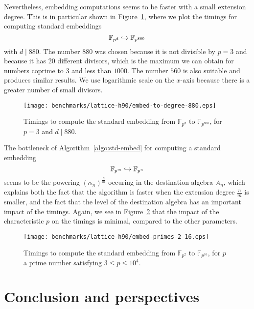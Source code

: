 Nevertheless, embedding computations seems to be faster with a small extension
degree. This is in particular shown in Figure~\ref{fig:embed-to-880}, where we
plot the timings for computing standard embeddings
\[
  \mathbb{F}_{p^d}\hookrightarrow\mathbb{F}_{p^{880}}
\]
with $d\mid880$. The number $880$ was chosen because it is not divisible by
$p=3$ and because it has 20 different divisors, which is the maximum we can
obtain for numbers coprime to $3$ and less than $1000$. The number $560$ is
also suitable and produces similar results. We use logarithmic scale on the
$x$-axis because there is a greater number of small divisors.
\begin{figure}
  \centering
  \texttt{[image: benchmarks/lattice-h90/embed-to-degree-880.eps]}
  \caption{Timings to compute the standard embedding from $\mathbb{F}_{p^d}$ to
  $\mathbb{F}_{p^{880}}$, for $p=3$ and $d\mid880$.}
  \label{fig:embed-to-880}
\end{figure}
The bottleneck of Algorithm~\ref{algo:std-embed} for computing a standard
embedding
\[
  \mathbb{F}_{p^m}\hookrightarrow\mathbb{F}_{p^{n}}
\]
seems to be the powering $(\alpha_n)^{\frac{n}{m}}$ occuring in the destination algebra
$A_n$, which explains both the fact
that the algorithm is faster when the extension degree $\frac{n}{m}$ is smaller,
and the fact that the level of the destination algebra has an important impact
of the timings.
Again, we see in Figure~\ref{fig:embed-primes} that the impact of the
characteristic $p$ on the timings is minimal, compared to the other parameters.
\begin{figure}
  \centering
  \texttt{[image: benchmarks/lattice-h90/embed-primes-2-16.eps]}
  \caption{Timings to compute the standard embedding from $\mathbb{F}_{p^2}$ to
  $\mathbb{F}_{p^{16}}$, for $p$ a prime number satisfying $3\leq p \leq 10^4$.}
  \label{fig:embed-primes}
\end{figure}

\section{Conclusion and perspectives}

